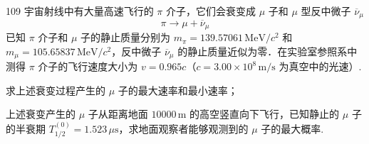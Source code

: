 \begin{problem}[2019年第36届全国中学生物理竞赛复赛][π介子衰变与μ子观测]{109}
宇宙射线中有大量高速飞行的 $\pi$ 介子，它们会衰变成 $\mu$ 子和 $\mu$ 型反中微子 $\overline{\nu}_{\mu}$
\[
\pi \rightarrow \mu + \overline{\nu}_{\mu}
\]
已知 $\pi$ 介子和 $\mu$ 子的静止质量分别为 $m_{\pi} = 139.57061\,\mathrm{MeV}/c^{2}$ 和 $m_{\mu} = 105.65837\,\mathrm{MeV}/c^{2}$，反中微子 $\overline{\nu}_{\mu}$ 的静止质量近似为零．在实验室参照系中测得 $\pi$ 介子的飞行速度大小为 $v = 0.965c$（$c = 3.00\times 10^{8}\,\mathrm{m/s}$ 为真空中的光速）.
\begin{subproblem}
求上述衰变过程产生的 $\mu$ 子的最大速率和最小速率；
\end{subproblem}
\begin{subproblem}
上述衰变产生的 $\mu$ 子从距离地面 $10000\,\mathrm{m}$ 的高空竖直向下飞行，已知静止的 $\mu$ 子的半衰期 $T_{1/2}^{(0)} = 1.523\,\mu\mathrm{s}$，求地面观察者能够观测到的 $\mu$ 子的最大概率.
\end{subproblem}
\end{problem}